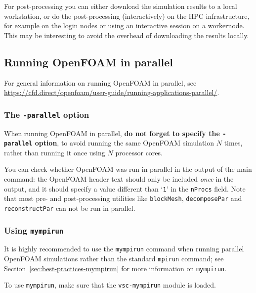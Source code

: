 For post-processing you can either download the simulation results to a local workstation,
or do the post-processing (interactively) on the HPC infrastructure, for example on the login nodes
or using an interactive session on a workernode. This may be interesting to avoid the overhead of
downloading the results locally.


\subsection{Running OpenFOAM in parallel}

For general information on running OpenFOAM in parallel,
see {\small\url{https://cfd.direct/openfoam/user-guide/running-applications-parallel/}}.

\subsubsection{The {\small\texttt{-parallel}} option}

When running OpenFOAM in parallel, \textbf{do not forget to specify the \texttt{\small{-parallel}} option},
to avoid running the same OpenFOAM simulation $N$ times, rather than running it once using $N$ processor cores.

You can check whether OpenFOAM was run in parallel in the output of the main command:
the OpenFOAM header text should only be included \textit{once} in the output, and it should specify a value different
than `\texttt{\small{1}}' in the \texttt{\small{nProcs}} field. Note that most pre- and post-processing utilities like
\texttt{\small{blockMesh}}, \texttt{\small{decomposePar}} and \texttt{\small{reconstructPar}} can not be run in parallel.

\subsubsection{Using \texttt{mympirun}}

It is highly recommended to use the {\small\texttt{mympirun}} command when running parallel OpenFOAM simulations
rather than the standard {\small\texttt{mpirun}} command;
see Section~\ref{sec:best-practices-mympirun} for more information on {\small\texttt{mympirun}}.

To use {\small\texttt{mympirun}}, make sure that the \texttt{\small{vsc-mympirun}} module is loaded.

\begin{prompt}
\end{prompt}

